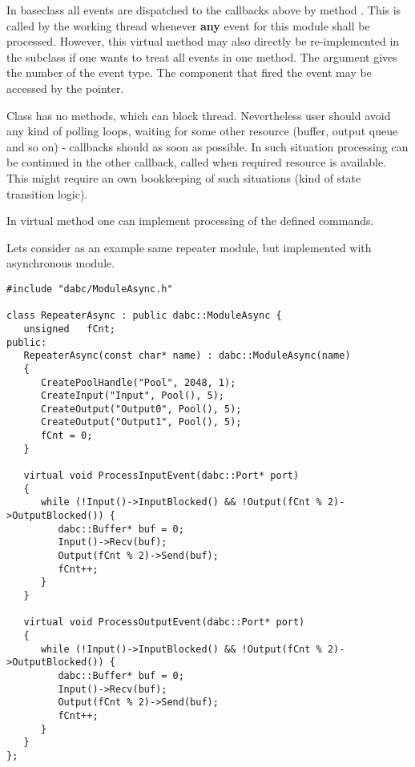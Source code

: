 \begin{compactenum}
\item   In baseclass  all events are dispatched to the callbacks above by method 
. 
This is called by the working thread
whenever {\bf any} event for this module shall be processed.
However, this virtual method  
may also directly be re-implemented in the  subclass
if one wants to treat all events in one method. 
The  argument gives the number of the event type. 
The component that fired the event may be accessed 
by the  pointer. 
      
\item  Class  has no methods, which can block thread.
Nevertheless user should avoid any kind of polling loops, waiting for some
other resource (buffer, output queue and so on) - callbacks should 
as soon as possible. In such situation processing can be continued in 
the other callback, called when required resource is available. 
This might require an own bookkeeping of such situations (kind of state transition logic). 

\item  In virtual  method one can implement 
      processing of the defined commands.

\end{compactenum}

Lets consider as an example same repeater module, but implemented with asynchronous module.
   
\begin{small}
\begin{verbatim}
#include "dabc/ModuleAsync.h"

class RepeaterAsync : public dabc::ModuleAsync {
   unsigned   fCnt;
public:
   RepeaterAsync(const char* name) : dabc::ModuleAsync(name)
   {
      CreatePoolHandle("Pool", 2048, 1);
      CreateInput("Input", Pool(), 5);
      CreateOutput("Output0", Pool(), 5);
      CreateOutput("Output1", Pool(), 5);
      fCnt = 0;
   }
    
   virtual void ProcessInputEvent(dabc::Port* port) 
   {
      while (!Input()->InputBlocked() && !Output(fCnt % 2)->OutputBlocked()) {
         dabc::Buffer* buf = 0;
         Input()->Recv(buf);
         Output(fCnt % 2)->Send(buf);
         fCnt++;
      }
   }

   virtual void ProcessOutputEvent(dabc::Port* port) 
   {
      while (!Input()->InputBlocked() && !Output(fCnt % 2)->OutputBlocked()) {
         dabc::Buffer* buf = 0;
         Input()->Recv(buf);
         Output(fCnt % 2)->Send(buf);
         fCnt++;
      }
   }
};
\end{verbatim}
\end{small}

